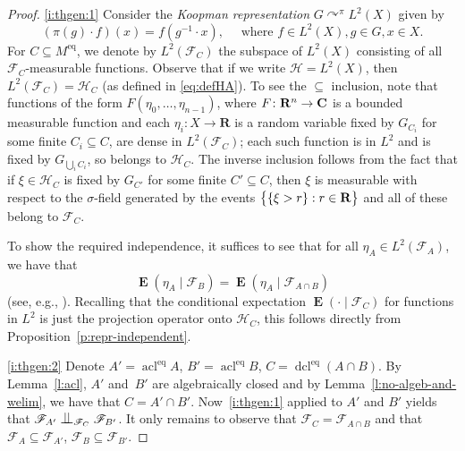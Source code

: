 \documentclass[11pt]{article}
\newcommand{\skpt}{\smallskip}
\let\mathcal\mathscr
\let\actson\curvearrowright
\let\sub\subseteq
\theoremstyle{plain}
\theoremstyle{definition}
\newcommand{\R}{{\mathbf R}}
\newcommand{\cF}{\mathcal{F}}
\newcommand{\cH}{\mathcal{H}}
\DeclareMathOperator{\acl}{acl}
\DeclareMathOperator{\dcl}{dcl}
\DeclareMathOperator{\E}{\mathbf{E}}
\DeclarePairedDelimiter\set{\{}{\}}
\newcommand{\eq}{^{\mathrm{eq}}}
\newcommand{\indep}[1][]{%
  \mathrel{
    \mathop{
      \scalebox{1}[1.3]{\text{$\perp\!\!\!\perp$}}
    }\displaylimits_{#1}
  }
}
\begin{document}
\skpt
\begin{proof}
\eqref{i:thgen:1}
Consider the \emph{Koopman representation} $G \actson^\pi L^2(X)$ given by
\begin{equation*}
(\pi(g) \cdot f)(x) = f(g^{-1} \cdot x), \quad \text{ where } f \in L^2(X), g \in G, x \in X.
\end{equation*}
For $C \sub M\eq$, we denote by $L^2(\cF_C)$ the subspace of $L^2(X)$ consisting of all $\cF_C$\nobreakdash-measurable functions. Observe that if we write $\cH = L^2(X)$, then $L^2(\cF_C) = \cH_C$ (as defined in \eqref{eq:defHA}). To see the $\sub$ inclusion, note that functions of the form $F(\eta_0, \ldots, \eta_{n-1})$, where $F \colon \R^n \to \C$ is a bounded measurable function and each $\eta_i \colon X \to \R$ is a random variable fixed by $G_{C_i}$ for some finite $C_i \sub C$, are dense in $L^2(\cF_C)$; each such function is in $L^2$ and is fixed by $G_{\bigcup_i C_i}$, so belongs to $\cH_C$. The inverse inclusion follows from the fact that if $\xi \in \cH_C$ is fixed by $G_{C'}$ for some finite $C' \sub C$, then $\xi$ is measurable with respect to the $\sigma$-field generated by the events $\set[\big]{\set{\xi > r} : r \in \R}$ and all of these belong to $\cF_C$.

To show the required independence, it suffices to see that for all $\eta_A \in L^2(\cF_A)$, we have that
\begin{equation*}
\E(\eta_A \mid \cF_B) = \E(\eta_A \mid \cF_{A \cap B})
\end{equation*}
(see, e.g., \cite[Prop.\,5.6]{Kallenberg2002}). Recalling that the conditional expectation $\E(\cdot \mid \cF_C)$ for functions in $L^2$ is just the projection operator onto $\cH_C$, this follows directly from Proposition~\ref{p:repr-independent}.

\eqref{i:thgen:2} Denote $A' = \acl\eq A$, $B' = \acl\eq B$, $C = \dcl\eq (A \cap B)$. By Lemma~\ref{l:acl}, $A'$ and~$B'$ are algebraically closed and by Lemma~\ref{l:no-algeb-and-welim}, we have that $C = A' \cap B'$. Now~\eqref{i:thgen:1} applied to $A'$ and $B'$ yields that $\cF_{A'} \indep[\cF_C] \cF_{B'}$. It only remains to observe that $\cF_C = \cF_{A \cap B}$ and that $\cF_A \sub \cF_{A'}$, $\cF_B \sub \cF_{B'}$.
\end{proof}
\end{document}
